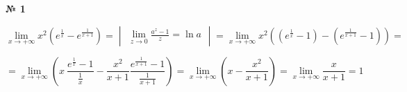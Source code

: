 \documentclass{article}
\begin{document}
\textbf{№ 1}
\Large

$$ \lim\limits_{x\to +\infty} x^2 \left( e^{\frac{1}{x}} - e^{\frac{1}{x+1}} \right) 
= \begin{vmatrix} \lim\limits_{z\to 0} \frac{a^{z} - 1}{z} = \ln{a} \end{vmatrix}
= \lim\limits_{x\to +\infty} x^2 \left( (e^{\frac{1}{x}} - 1) -  (e^{\frac{1}{x+1}} - 1) \right) 
= $$

$$ = \lim\limits_{x\to +\infty} \left( x \ \frac{e^{\frac{1}{x}} - 1}{\frac{1}{x}} - \frac{x^2}{x+1} \frac{ e^{\frac{1}{x+1}} -1 }{ \frac{1}{x+1} } \right)
= \lim\limits_{x\to +\infty} \left( x - \frac{x^2}{x+1} \right) 
= \lim\limits_{x\to +\infty} \frac{x}{x+1}
= 1$$
\end{document}
